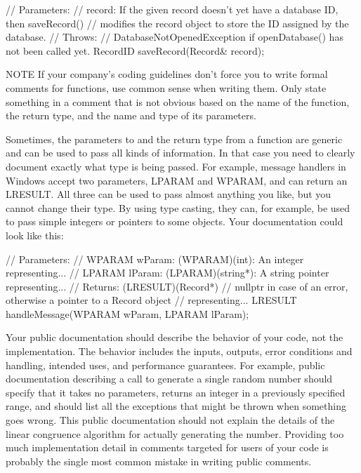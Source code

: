 \begin{cpp}
// Parameters:
//    record: If the given record doesn't yet have a database ID, then saveRecord()
//    modifies the record object to store the ID assigned by the database.
// Throws:
//    DatabaseNotOpenedException if openDatabase() has not been called yet.
RecordID saveRecord(Record& record);
\end{cpp}

\begin{myNotic}{NOTE}
If your company’s coding guidelines don’t force you to write formal comments for functions, use common sense when writing them. Only state something in a comment that is not obvious based on the name of the function, the return type, and the name and type of its parameters.
\end{myNotic}

Sometimes, the parameters to and the return type from a function are generic and can be used to pass all kinds of information. In that case you need to clearly document exactly what type is being passed. For example, message handlers in Windows accept two parameters, LPARAM and WPARAM, and can return an LRESULT. All three can be used to pass almost anything you like, but you cannot change their type. By using type casting, they can, for example, be used to pass simple integers or pointers to some objects. Your documentation could look like this:

\begin{cpp}
// Parameters:
//    WPARAM wParam: (WPARAM)(int): An integer representing...
//    LPARAM lParam: (LPARAM)(string*): A string pointer representing...
// Returns: (LRESULT)(Record*)
//    nullptr in case of an error, otherwise a pointer to a Record object
//    representing...
LRESULT handleMessage(WPARAM wParam, LPARAM lParam);
\end{cpp}

Your public documentation should describe the behavior of your code, not the implementation. The behavior includes the inputs, outputs, error conditions and handling, intended uses, and performance guarantees. For example, public documentation describing a call to generate a single random number should specify that it takes no parameters, returns an integer in a previously specified range, and should list all the exceptions that might be thrown when something goes wrong. This public documentation should not explain the details of the linear congruence algorithm for actually generating the number. Providing too much implementation detail in comments targeted for users of your code is probably the single most common mistake in writing public comments.

